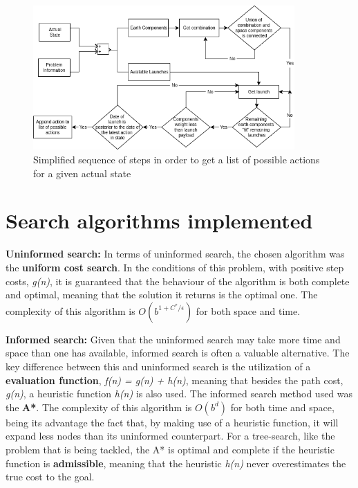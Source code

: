 \documentclass[11pt,a4paper,oneside]{article}
\begin{document}
\begin{figure}[H]
    \centering
    \includegraphics[width=10cm]{images/new_possible_actions.png}
    \caption{Simplified sequence of steps in order to get a list of possible actions for a given actual state}
    \label{fig:possible_actions}
\end{figure}

\section{Search algorithms implemented}

\textbf{Uninformed search:} In terms of uninformed search, the chosen algorithm was the \textbf{uniform cost search}. In the conditions of this problem, with positive step costs, \textit{g(n)}, it is guaranteed that the behaviour of the algorithm is both complete and optimal, meaning that the solution it returns is the optimal one. The complexity of this algorithm is $O(b^{1 + C^{*}/\epsilon})$ for both space and time.

\hspace{-6mm}\textbf{Informed search:} 
Given that the uninformed search may take more time and space than one has available, informed search is often a valuable alternative. The key difference between this and uninformed search is the utilization of a \textbf{evaluation function}, \textit{f(n) = g(n) + h(n)}, meaning that besides the path cost, \textit{g(n)}, a heuristic function \textit{h(n)} is also used. The informed search method used was the \textbf{A*}. The complexity of this algorithm is $O(b^d)$ for both time and space, being its advantage the fact that, by making use of a heuristic function, it will expand less nodes than its uninformed counterpart. For a tree-search, like the problem that is being tackled, the A* is optimal and complete if the heuristic function is \textbf{admissible}, meaning that the heuristic \textit{h(n)} never overestimates the true cost to the goal. 
\end{document}
